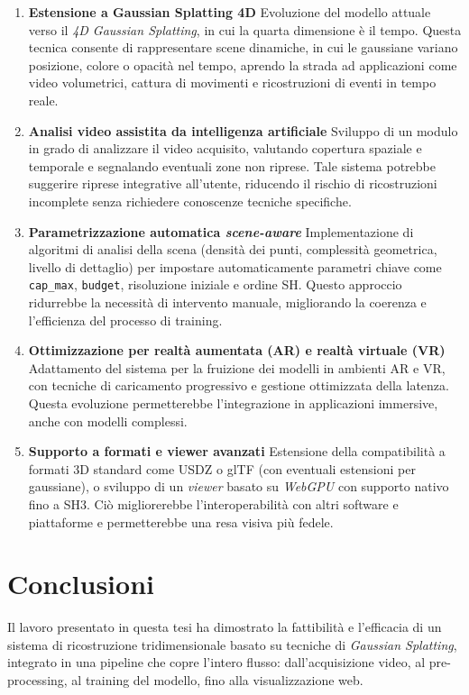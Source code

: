 \begin{enumerate}
	\item \textbf{Estensione a Gaussian Splatting 4D}  
	Evoluzione del modello attuale verso il \emph{4D Gaussian Splatting}, in cui la quarta dimensione è il tempo.  
	Questa tecnica consente di rappresentare scene dinamiche, in cui le gaussiane variano posizione, colore o opacità nel tempo, aprendo la strada ad applicazioni come video volumetrici, cattura di movimenti e ricostruzioni di eventi in tempo reale.
	
	\item \textbf{Analisi video assistita da intelligenza artificiale}  
	Sviluppo di un modulo in grado di analizzare il video acquisito, valutando copertura spaziale e temporale e segnalando eventuali zone non riprese.  
	Tale sistema potrebbe suggerire riprese integrative all'utente, riducendo il rischio di ricostruzioni incomplete senza richiedere conoscenze tecniche specifiche.
	
	\item \textbf{Parametrizzazione automatica \emph{scene-aware}}  
	Implementazione di algoritmi di analisi della scena (densità dei punti, complessità geometrica, livello di dettaglio) per impostare automaticamente parametri chiave come \texttt{cap\_max}, \texttt{budget}, risoluzione iniziale e ordine SH.  
	Questo approccio ridurrebbe la necessità di intervento manuale, migliorando la coerenza e l'efficienza del processo di training.
	
	\item \textbf{Ottimizzazione per realtà aumentata (AR) e realtà virtuale (VR)}  
	Adattamento del sistema per la fruizione dei modelli in ambienti AR e VR, con tecniche di caricamento progressivo e gestione ottimizzata della latenza.  
	Questa evoluzione permetterebbe l'integrazione in applicazioni immersive, anche con modelli complessi.
	
	\item \textbf{Supporto a formati e viewer avanzati}  
	Estensione della compatibilità a formati 3D standard come USDZ o glTF (con eventuali estensioni per gaussiane), o sviluppo di un \emph{viewer} basato su \emph{WebGPU} con supporto nativo fino a SH3.  
	Ciò migliorerebbe l'interoperabilità con altri software e piattaforme e permetterebbe una resa visiva più fedele.
\end{enumerate}

\section{Conclusioni}
Il lavoro presentato in questa tesi ha dimostrato la fattibilità e l'efficacia di un sistema di ricostruzione tridimensionale basato su tecniche di \emph{Gaussian Splatting}, integrato in una pipeline che copre l'intero flusso: dall'acquisizione video, al pre-processing, al training del modello, fino alla visualizzazione web.  


